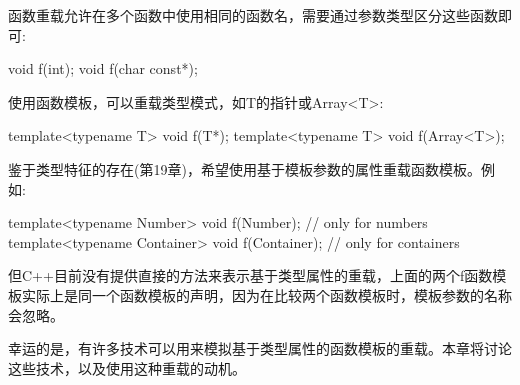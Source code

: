 
函数重载允许在多个函数中使用相同的函数名，需要通过参数类型区分这些函数即可:

\begin{cpp}
void f(int);
void f(char const*);
\end{cpp}

使用函数模板，可以重载类型模式，如T的指针或Array<T>:

\begin{cpp}
template<typename T> void f(T*);
template<typename T> void f(Array<T>);
\end{cpp}

鉴于类型特征的存在(第19章)，希望使用基于模板参数的属性重载函数模板。例如:

\begin{cpp}
template<typename Number> void f(Number); // only for numbers
template<typename Container> void f(Container); // only for containers
\end{cpp}

但C++目前没有提供直接的方法来表示基于类型属性的重载，上面的两个f函数模板实际上是同一个函数模板的声明，因为在比较两个函数模板时，模板参数的名称会忽略。

幸运的是，有许多技术可以用来模拟基于类型属性的函数模板的重载。本章将讨论这些技术，以及使用这种重载的动机。






























